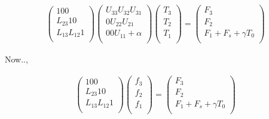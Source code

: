 \begin{eqnarray}
  \left( \begin{array}{lll}
         1       0       0      \\
         L_{23}  1       0      \\
         L_{13}  L_{12}  1      \\
         \end{array} \right)
  \left( \begin{array}{lll}
         U_{33}  U_{32}  U_{31} \\
         0       U_{22}  U_{21} \\
         0       0       U_{11}+\alpha \\
         \end{array} \right)
  \left( \begin{array}{l}
         T_3 \\ T_2 \\ T_1 \\
         \end{array} \right)
  =
  \left(  \begin{array}{l}
          F_3 \\ F_2 \\ F_1 + F_s + \gamma T_0 \\
          \end{array} \right)
\end{eqnarray}

Now..,

\begin{eqnarray}
  \left( \begin{array}{lll}
         1       0       0      \\
         L_{23}  1       0      \\
         L_{13}  L_{12}  1      \\
         \end{array} \right)
  \left( \begin{array}{l}
         f_3 \\ f_2 \\ f_1 \\
         \end{array} \right)
  =
  \left(  \begin{array}{l}
          F_3 \\ F_2 \\ F_1 + F_s + \gamma T_0 \\
          \end{array} \right)
\end{eqnarray}

